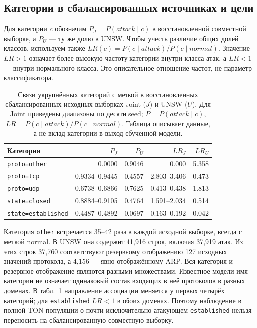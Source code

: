 \subsection{Категории в сбалансированных источниках и цели}
Для категории $c$ обозначим $P_J=P(attack\mid c)$ в восстановленной совместной выборке, а $P_U$ --- ту же долю в UNSW. Чтобы учесть различие общих долей классов, используем также $LR(c)=P(c\mid attack)/P(c\mid normal)$. Значение $LR>1$ означает более высокую частоту категории внутри класса атак, а $LR<1$ --- внутри нормального класса. Это описательное отношение частот, не параметр классификатора.

\begin{table}[htbp]
\caption{Связи укрупнённых категорий с меткой в восстановленных сбалансированных исходных выборках Joint ($J$) и UNSW ($U$). Для Joint приведены диапазоны по десяти seed; $P=P(attack\mid c)$, $LR=P(c\mid attack)/P(c\mid normal)$. Таблица описывает данные, а не вклад категории в выход обученной модели.}
\label{tab:unsw-category-shift}
\centering\small\setlength{\tabcolsep}{4pt}
\begin{tabular}{lrrrr}
\toprule
Категория & $P_J$ & $P_U$ & $LR_J$ & $LR_U$\\
\midrule
\texttt{proto=other} & 0.0000 & 0.9046 & 0.000 & 5.358\\
\texttt{proto=tcp} & 0.9334--0.9445 & 0.4557 & 2.803--3.406 & 0.473\\
\texttt{proto=udp} & 0.6738--0.6866 & 0.7625 & 0.413--0.438 & 1.813\\
\texttt{state=closed} & 0.8884--0.9105 & 0.4764 & 1.591--2.034 & 0.514\\
\texttt{state=established} & 0.4487--0.4892 & 0.0697 & 0.163--0.192 & 0.042\\
\bottomrule
\end{tabular}
\end{table}

Категория \texttt{other} встречается 35--42 раза в каждой исходной выборке, всегда с меткой normal. В UNSW она содержит 41,916 строк, включая 37,919 атак. Из этих строк 37,760 соответствуют резервному отображению 127 исходных значений протокола, а 4,156 --- явно отображённому ARP. Вся категория и резервное отображение являются разными множествами. Известное модели имя категории не означает одинаковый состав входящих в неё протоколов в разных доменах. В табл.~\ref{tab:unsw-category-shift} направление ассоциации меняется у первых четырёх категорий; для \texttt{established} $LR<1$ в обоих доменах. Поэтому наблюдение в полной TON-популяции о почти исключительно атакующем \texttt{established} нельзя переносить на сбалансированную совместную выборку.

